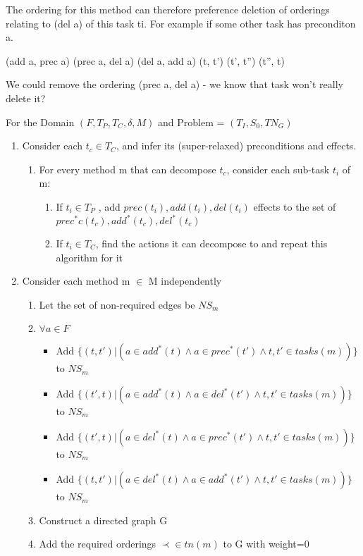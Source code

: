 The ordering for this method can therefore preference deletion of orderings relating to (del a) of this task ti.
For example if some other task has preconditon a.

(add a, prec a) (prec a, del a)  (del a,  add a)
(t,       t')     (t',     t'')   (t'',    t) 

We could remove the ordering (prec a, del a) - we know that task won't really delete it?


For the Domain $(F, T_P, T_C, \delta, M)$ and Problem = $(T_I, S_0, TN_G)$
\begin{enumerate}
	\item Consider each $t_c \in T_C$, and infer its (super-relaxed) preconditions and effects.
	\begin{enumerate}
		\item For every method m that can decompose $t_c$, consider each sub-task $t_i$ of m:
		\begin{enumerate}
			\item If $t_i \in T_P$ , add $prec(t_i), add(t_i), del(t_i)$ effects to the set of $prec^{*}c(t_c), add^{*}(t_c), del^{*}(t_c)$
			\item If $t_i \in T_C$, find the actions it can decompose to and repeat this algorithm for it
		\end{enumerate}
	\end{enumerate}
	\item Consider each method m $\in$ M independently
	\begin{enumerate}	
		\item Let the set of non-required edges be $NS_m$
		\item $\forall a \in F$
		\begin{itemize}			
			\item Add $\{ (t, t') |  (a \in add^{*}(t) \land a \in prec^{*}(t') \land t, t' \in tasks(m) ) \}$ to $NS_m$ 
			\item Add $\{ (t', t) |  (a \in add^{*}(t) \land a \in del^{*}(t') \land t, t' \in tasks(m) ) \}$ to $NS_m$ 
			\item Add $\{ (t', t) |  (a \in del^{*}(t) \land a \in prec^{*}(t') \land t, t' \in tasks(m) ) \}$ to $NS_m$ 
			\item Add $\{ (t, t') |  (a \in del^{*}(t) \land a \in add^{*}(t') \land t, t' \in tasks(m) ) \}$ to $NS_m$ 
		\end{itemize}
		\item Construct a directed graph G
		\item Add the required orderings $\prec \in tn(m)$ to G with weight=0

\end{enumerate}
\end{enumerate}

